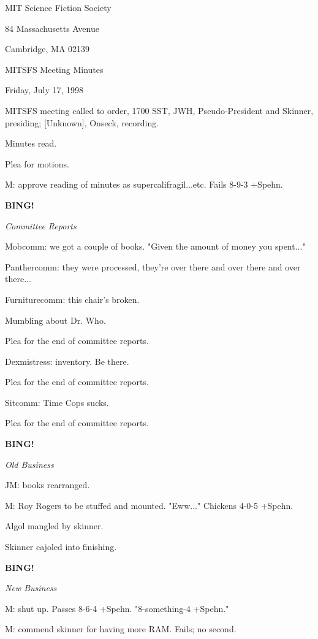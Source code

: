 \documentclass[12pt]{article}
\newcommand{\bing}{{\bf BING!} }
\newcommand{\goto}[1]{\bing \vskip 12pt \centerline{{\em{#1}}}}
\begin{document}
\begin{center}

MIT Science Fiction Society 

84 Massachusetts Avenue

Cambridge, MA 02139

\vspace{12pt}

MITSFS Meeting Minutes 

Friday, July 17, 1998

\end{center}
 
\vspace{18pt}

\setlength{\parskip}{6pt}

\noindent
MITSFS meeting called to order, 1700 SST,
JWH, Pseudo-President and Skinner, presiding; [Unknown], Onseck, recording.

Minutes read.

Plea for motions.

M: approve reading of minutes as supercalifragil...etc. Fails 8-9-3 +Spehn.

\goto{Committee Reports}

Mobcomm: we got a couple of books. "Given the amount of money you spent..."

Panthercomm: they were processed, they're over there and over there and over there...

Furniturecomm: this chair's broken.

Mumbling about Dr. Who.

Plea for the end of committee reports.

Dexmistress: inventory. Be there.

Plea for the end of committee reports.

Sitcomm: Time Cops sucks.

Plea for the end of committee reports.

\goto{Old Business}

JM: books rearranged.

M: Roy Rogers to be stuffed and mounted. "Eww..." Chickens 4-0-5 +Spehn.

Algol mangled by skinner.

Skinner cajoled into finishing.

\goto{New Business}

M: shut up. Passes 8-6-4 +Spehn. "8-something-4 +Spehn."

M: commend skinner for having more RAM. Fails; no second.
\end{document}
